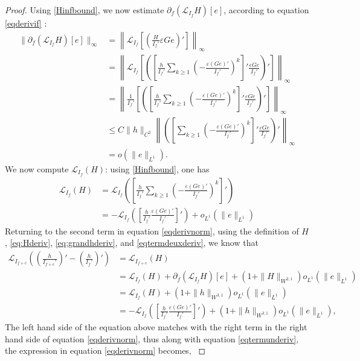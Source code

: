 \documentclass[12pt]{article}
\def\L{\mathcal{L}}
\newcommand{\eps}{\varepsilon}
\theoremstyle{plain}
\begin{document}
{\begin{proof}
Using \eqref{Hinfbound}, we now estimate $\partial_f(\L_{I_f}H)[e]$, according to equation \eqref{eqderivif} :
\begin{align}\label{eq:grandhderiv}
    \|\partial_f(\L_{I_f}H)[e]\|_\infty&=\left\|\L_{I_f}\left[\left(\frac{H}{I_{f}'} \eps G e\right)'\right] \right\|_\infty\nonumber\\
    &=\left\|\L_{I_f}\left[\left(\left[\frac{h}{I_{f}'}\sum_{k\geq 1}\left(-\frac{\eps (Ge)'}{I_{f}'}\right)^k\right]'\frac{\eps G e}{I_{f}'} \right)'\right]\right\|_\infty\nonumber\\
    &=\left\|\frac{1}{I_{f}'}\left[\left(\left[\frac{h}{I_{f}'}\sum_{k\geq 1}\left(-\frac{\eps (Ge)'}{I_{f}'}\right)^k\right]'\frac{\eps G e}{I_{f}'} \right)'\right]\right\|_\infty\nonumber\\
    &\leq C\|h\|_{C^2}\left\|\left(\left[\sum_{k\geq 1}\left(-\frac{\eps (Ge)'}{I_{f}'}\right)^k\right]'\frac{\eps G e}{I_{f}'} \right)'\right\|_\infty\nonumber\\
    &=o(\|e\|_{L^1}).
\end{align}
We now compute $\L_{I_f}\left(H\right)$: using \eqref{Hinfbound}, one has
\begin{align}\label{eqtermdeuxderiv}
\L_{I_f}\left(H\right)&= \L_{I_f}\left(\left[\frac{h}{I_{f}'}\sum_{k\geq 1}\left(-\frac{\eps (Ge)'}{I_{f}'}\right)^k\right]'\right)\nonumber\\
&=-\L_{I_f}\left(\left[\frac{h}{I_{f}'}\frac{\eps (Ge)'}{I_{f}'}\right]'\right)+o_{L^1}(\|e\|_{L^1})
\end{align}
Returning to the second term in equation \eqref{eqderivnorm}, using the definition of $H$,  \eqref{eq:Hderiv}, \eqref{eq:grandhderiv}, and \eqref{eqtermdeuxderiv},  we know that 
{\begin{align*}
    \L_{I_{f+e}}\left(\left(\frac{h}{I_{f+e}'}\right)'-\left(\frac{h}{I_f'}\right)'\right)&=\L_{I_{f+e}}(H)\\
    &=\L_{I_{f}}(H)+\partial_f(\L_{I_f}H)[e]+(1+\|H\|_{W^{2,1}})o_{L^1}(\|e\|_{L^1})\\
    &=\L_{I_{f}}(H)+(1+\|h\|_{W^{3,1}})o_{L^1}(\|e\|_{L^1})\\
 &=-\L_{I_f}\left(\left[\frac{h}{I_{f}'}\frac{\eps (Ge)'}{I_{f}'}\right]'\right)+(1+\|h\|_{W^{3,1}})o_{L^1}(\|e\|_{L^1}),
\end{align*}
The left hand side of the equation above matches with the right term in the right hand side of equation \eqref{eqderivnorm}, thus along with equation \eqref{eqtermunderiv}, the expression in equation \eqref{eqderivnorm} becomes,
}



\end{proof}}
\end{document}

